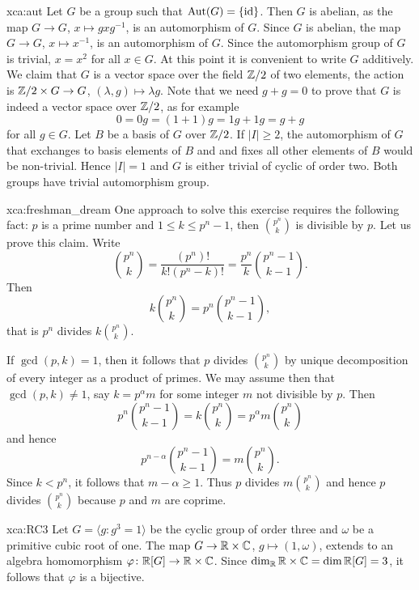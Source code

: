 \begin{sol}{xca:aut}
    Let $G$ be a group such that $\operatorname{Aut}(G)=\{\operatorname{id}\}$. 
    Then $G$ is abelian, as the map $G\to G$, $x\mapsto gxg^{-1}$,   
    is an automorphism of $G$. Since $G$ is abelian, 
    the map $G\to G$, $x\mapsto x^{-1}$, is an automorphism of $G$. Since 
    the automorphism group of $G$ is trivial, 
    $x=x^2$ for all $x\in G$. 
    At this point it is convenient to write $G$ additively. We claim that 
    $G$ is a vector space
    over the field $\mathbb{Z}/2$ of two elements, the action
    is $\mathbb{Z}/2\times G\to G$, $(\lambda,g)\mapsto \lambda g$. Note that
    we need $g+g=0$ to prove that $G$ is indeed a vector space over $\mathbb{Z}/2$, as for example
    \[
    0=0g=(1+1)g=1g+1g=g+g
    \]
    for all $g\in G$. 
    Let $B$ be   
    a basis of $G$ over $\mathbb{Z}/2$. If $|I|\geq 2$, 
    the automorphism of $G$ that exchanges to basis elements of $B$ and  
    and fixes all other elements of $B$ would be non-trivial. Hence $|I|=1$ and 
    $G$ is either trivial of cyclic of order two. Both groups have trivial
    automorphism group. 
\end{sol}


\begin{sol}{xca:freshman_dream}
    One approach to solve this exercise requires the following fact: 
    $p$ is a prime number and $1\leq k\leq p^n-1$, then $\binom{p^n}{k}$ is divisible by $p$.
    Let us prove this claim. Write
    \[
    \binom{p^n}{k}=\frac{(p^n)!}{k!(p^n-k)!}=\frac{p^n}{k}\binom{p^n-1}{k-1}.
    \]
    Then
    \[
    k\binom{p^n}{k}=p^n\binom{p^n-1}{k-1},
    \]
    that is $p^n$ divides $k\binom{p^n}{k}$. 
    
    If $\gcd(p,k)=1$, then it follows that $p$ divides $\binom{p^n}{k}$ by unique decomposition
    of every integer as a product of primes. We may assume then that $\gcd(p,k)\ne1$, 
    say $k=p^\alpha m$ for some integer $m$ not divisible by $p$. Then
    \[
    p^n\binom{p^n-1}{k-1}=k\binom{p^n}{k}=p^{\alpha}m\binom{p^n}{k}
    \]
    and hence 
    \[
    p^{n-\alpha}\binom{p^n-1}{k-1}=m\binom{p^n}{k}.
    \]
    Since $k<p^n$, it follows that
    $m-\alpha\geq 1$. Thus $p$ divides $m\binom{p^n}{k}$ and hence
    $p$ divides $\binom{p^n}{k}$ because $p$ and $m$ are coprime. 
\end{sol}


\begin{sol}{xca:RC3}
Let $G=\langle g:g^3=1\rangle$ be the cyclic group of order three and $\omega$ be a primitive cubic root of one.  
The map $G\to \mathbb{R}\times\mathbb{C}$, $g\mapsto (1,\omega)$, extends to an algebra
homomorphism $\varphi\colon\mathbb{R}[G]\to\mathbb{R}\times\mathbb{C}$. Since 
$\dim_{\mathbb{R}}\mathbb{R}\times\mathbb{C}=\dim\mathbb{R}[G]=3$, it follows that $\varphi$ is a bijective. 
\end{sol}


